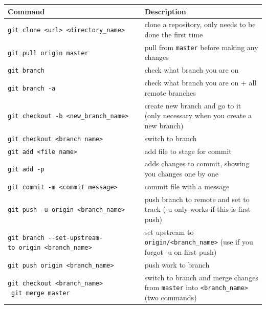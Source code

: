 \documentclass[
]{book}
\newcounter{none} %
\begin{document}
{\def\LTcaptype{none} %
\begin{longtable}[]{@{}
  >{\raggedright\arraybackslash}p{}
  >{\raggedright\arraybackslash}p{}@{}}
\toprule\noalign{}
\begin{minipage}[b]{\linewidth}\raggedright
Command
\end{minipage} & \begin{minipage}[b]{\linewidth}\raggedright
Description
\end{minipage} \\
\midrule\noalign{}
\endhead
\bottomrule\noalign{}
\endlastfoot
\texttt{git\ clone\ \textless{}url\textgreater{}\ \textless{}directory\_name\textgreater{}} & clone a repository, only needs to be done the first time \\
\texttt{git\ pull\ origin\ master} & pull from \texttt{master} before making any changes \\
\texttt{git\ branch} & check what branch you are on \\
\texttt{git\ branch\ -a} & check what branch you are on + all remote branches \\
\texttt{git\ checkout\ -b\ \textless{}new\_branch\_name\textgreater{}} & create new branch and go to it (only necessary when you create a new branch) \\
\texttt{git\ checkout\ \textless{}branch\ name\textgreater{}} & switch to branch \\
\texttt{git\ add\ \textless{}file\ name\textgreater{}} & add file to stage for commit \\
\texttt{git\ add\ -p} & adds changes to commit, showing you changes one by one \\
\texttt{git\ commit\ -m\ \textless{}commit\ message\textgreater{}} & commit file with a message \\
\texttt{git\ push\ -u\ origin\ \textless{}branch\_name\textgreater{}} & push branch to remote and set to track (-u only works if this is first push) \\
\texttt{git\ branch\ -\/-set-upstream-to\ origin\ \textless{}branch\_name\textgreater{}} & set upstream to \texttt{origin/\textless{}branch\_name\textgreater{}} (use if you forgot -u on first push) \\
\texttt{git\ push\ origin\ \textless{}branch\_name\textgreater{}} & push work to branch \\
\texttt{git\ checkout\ \textless{}branch\_name\textgreater{}} ~\texttt{git\ merge\ master} & switch to branch and merge changes from \texttt{master} into \texttt{\textless{}branch\_name\textgreater{}} (two commands) \\

\end{longtable}}
\end{document}
